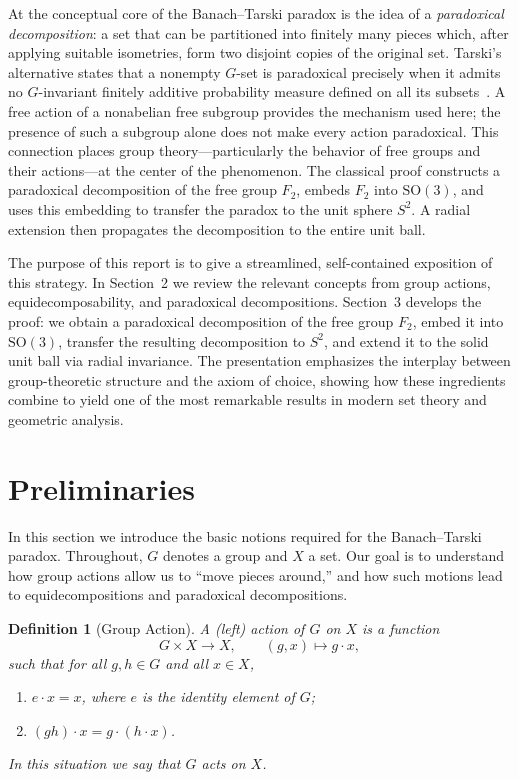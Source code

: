 \documentclass[12pt,a4paper]{article}
\theoremstyle{spaced}
\newtheorem{definition}{Definition}[section]
\begin{document}
At the conceptual core of the Banach--Tarski paradox is the idea of a
\emph{paradoxical decomposition}: a set that can be partitioned into finitely
many pieces which, after applying suitable isometries, form two disjoint copies
of the original set. Tarski's alternative states that a nonempty $G$-set is
paradoxical precisely when it admits no $G$-invariant finitely additive
probability measure defined on all its subsets~\cite{drutu_kapovich_ggt}.
A free action of a nonabelian free subgroup provides the mechanism used here;
the presence of such a subgroup alone does not make every action paradoxical.
This connection
places group theory—particularly the behavior of free groups and their
actions—at the center of the phenomenon. The classical proof constructs a
paradoxical decomposition of the free group $F_2$, embeds $F_2$ into
$\mathrm{SO}(3)$, and uses this embedding to transfer the paradox to the unit
sphere $S^2$. A radial extension then propagates the decomposition to the entire
unit ball.

The purpose of this report is to give a streamlined, self-contained exposition of
this strategy. In Section~2 we review the relevant concepts from group actions,
equidecomposability, and paradoxical decompositions. Section~3 develops the
proof: we obtain a paradoxical decomposition of the free group $F_2$, embed it
into $\mathrm{SO}(3)$, transfer the resulting decomposition to $S^2$, and extend
it to the solid unit ball via radial invariance. The presentation emphasizes the
interplay between group-theoretic structure and the axiom of choice, showing how
these ingredients combine to yield one of the most remarkable results in modern
set theory and geometric analysis.

\section{Preliminaries}
In this section we introduce the basic notions required for the Banach--Tarski paradox.
Throughout, $G$ denotes a group and $X$ a set.
Our goal is to understand how group actions allow us to ``move pieces around,'' and how
such motions lead to equidecompositions and paradoxical decompositions.

\begin{definition}[Group Action]
	A \emph{(left) action} of $G$ on $X$ is a function
	\[
		G \times X \longrightarrow X, \qquad (g,x) \mapsto g \cdot x,
	\]
	such that for all $g,h \in G$ and all $x \in X$,
	\begin{enumerate}
		\item $e \cdot x = x$, where $e$ is the identity element of $G$;
		\item $(gh)\cdot x = g \cdot (h \cdot x)$.
	\end{enumerate}
	In this situation we say that $G$ \emph{acts} on $X$.
\end{definition}
\end{document}
